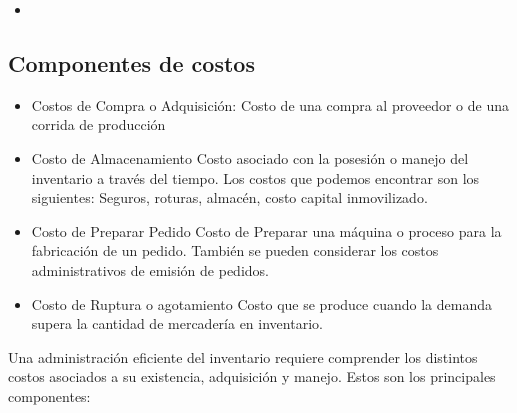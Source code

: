 \documentclass[a4paper,oneside,11pt]{article}
\begin{document}
\begin{itemize}
    \item 
\end{itemize}

\subsection{Componentes de costos}
\begin{itemize}
    \item Costos de Compra o Adquisición: Costo de una compra al proveedor o de una corrida de producción
    \item Costo de Almacenamiento Costo asociado con la posesión o manejo del inventario a través del tiempo. Los costos que podemos encontrar son los siguientes: Seguros, roturas, almacén, costo capital inmovilizado.
    \item Costo de Preparar Pedido Costo de Preparar una máquina o proceso para la fabricación de un pedido. También se pueden considerar los costos administrativos de emisión de pedidos.
    \item Costo de Ruptura o agotamiento Costo que se produce cuando la demanda supera la cantidad de mercadería en inventario.
\end{itemize}

Una administración eficiente del inventario requiere comprender los distintos costos asociados a su existencia, adquisición y manejo. Estos son los principales componentes:
\end{document}
